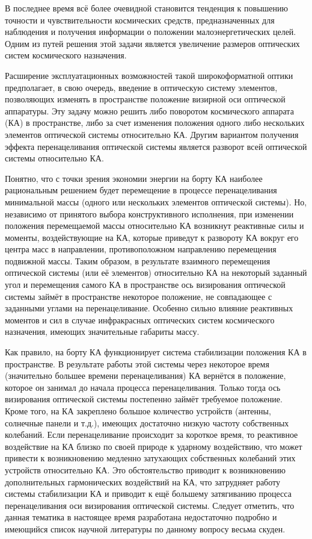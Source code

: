 
{\actuality} В последнее время всё более очевидной становится тенденция к повышению точности и чувствительности космических средств, предназначенных для наблюдения и получения информации о положении малоэнергетических целей. Одним из путей решения этой задачи является увеличение размеров оптических систем космического назначения.

Расширение эксплуатационных возможностей такой широкоформатной оптики предполагает, в свою очередь, введение в оптическую систему элементов, позволяющих изменять в пространстве положение визирной оси оптической аппаратуры. Эту задачу можно решить либо поворотом космического аппарата (КА) в пространстве, либо за счет изменения положения одного либо нескольких элементов оптической системы относительно КА. Другим вариантом получения эффекта перенацеливания оптической системы является разворот всей оптической системы относительно КА.
~\autocite{Gosele1999161,Lermontov}

Понятно, что с точки зрения экономии энергии на борту КА наиболее рациональным решением будет перемещение в процессе перенацеливания минимальной массы (одного или нескольких элементов оптической системы). Но, независимо от принятого выбора конструктивного исполнения, при изменении положения перемещаемой массы относительно КА возникнут реактивные силы и моменты, воздействующие на КА, которые приведут к развороту КА вокруг его центра масс в направлении, противоположном направлению перемещения подвижной массы. Таким образом, в результате взаимного перемещения оптической системы (или её элементов) относительно КА на некоторый заданный угол и перемещения самого КА в пространстве ось визирования оптической системы займёт в пространстве некоторое положение, не совпадающее с заданными углами на перенацеливание.  Особенно сильно влияние реактивных моментов и сил в случае инфракрасных оптических систем космического назначения, имеющих значительные габариты массу. 

Как правило, на борту КА функционирует система стабилизации положения КА в пространстве. В результате работы этой системы через некоторое время (значительно большее времени перенацеливания) КА вернётся в положение, которое он занимал до начала процесса перенацеливания. Только тогда ось визирования оптической системы постепенно займёт требуемое положение. Кроме того, на КА закреплено большое количество устройств (антенны, солнечные панели и т.д.), имеющих достаточно низкую частоту собственных колебаний. Если перенацеливание происходит за короткое время, то реактивное воздействие на КА близко по своей природе к ударному воздействию, что может привести к возникновению медленно затухающих собственных колебаний этих устройств относительно КА. Это обстоятельство приводит к возникновению дополнительных гармонических воздействий на КА, что затрудняет работу системы стабилизации КА и приводит к ещё большему затягиванию процесса перенацеливания оси визирования оптической системы.
Следует отметить, что данная тематика в настоящее время разработана недостаточно подробно и имеющийся список научной литературы по данному вопросу весьма скуден.

